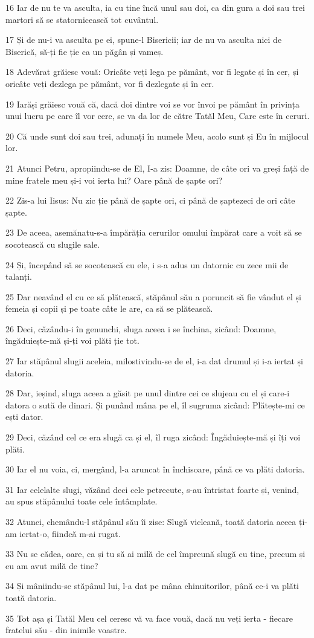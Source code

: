 \par 16 Iar de nu te va asculta, ia cu tine încă unul sau doi, ca din gura a doi sau trei martori să se statornicească tot cuvântul.
\par 17 Și de nu-i va asculta pe ei, spune-l Bisericii; iar de nu va asculta nici de Biserică, să-ți fie ție ca un păgân și vameș.
\par 18 Adevărat grăiesc vouă: Oricâte veți lega pe pământ, vor fi legate și în cer, și oricâte veți dezlega pe pământ, vor fi dezlegate și în cer.
\par 19 Iarăși grăiesc vouă că, dacă doi dintre voi se vor învoi pe pământ în privința unui lucru pe care îl vor cere, se va da lor de către Tatăl Meu, Care este în ceruri.
\par 20 Că unde sunt doi sau trei, adunați în numele Meu, acolo sunt și Eu în mijlocul lor.
\par 21 Atunci Petru, apropiindu-se de El, I-a zis: Doamne, de câte ori va greși față de mine fratele meu și-i voi ierta lui? Oare până de șapte ori?
\par 22 Zis-a lui Iisus: Nu zic ție până de șapte ori, ci până de șaptezeci de ori câte șapte.
\par 23 De aceea, asemănatu-s-a împărăția cerurilor omului împărat care a voit să se socotească cu slugile sale.
\par 24 Și, începând să se socotească cu ele, i s-a adus un datornic cu zece mii de talanți.
\par 25 Dar neavând el cu ce să plătească, stăpânul său a poruncit să fie vândut el și femeia și copii și pe toate câte le are, ca să se plătească.
\par 26 Deci, căzându-i în genunchi, sluga aceea i se închina, zicând: Doamne, îngăduiește-mă și-ți voi plăti ție tot.
\par 27 Iar stăpânul slugii aceleia, milostivindu-se de el, i-a dat drumul și i-a iertat și datoria.
\par 28 Dar, ieșind, sluga aceea a găsit pe unul dintre cei ce slujeau cu el și care-i datora o sută de dinari. Și punând mâna pe el, îl sugruma zicând: Plătește-mi ce ești dator.
\par 29 Deci, căzând cel ce era slugă ca și el, îl ruga zicând: Îngăduiește-mă și îți voi plăti.
\par 30 Iar el nu voia, ci, mergând, l-a aruncat în închisoare, până ce va plăti datoria.
\par 31 Iar celelalte slugi, văzând deci cele petrecute, s-au întristat foarte și, venind, au spus stăpânului toate cele întâmplate.
\par 32 Atunci, chemându-l stăpânul său îi zise: Slugă vicleană, toată datoria aceea ți-am iertat-o, fiindcă m-ai rugat.
\par 33 Nu se cădea, oare, ca și tu să ai milă de cel împreună slugă cu tine, precum și eu am avut milă de tine?
\par 34 Și mâniindu-se stăpânul lui, l-a dat pe mâna chinuitorilor, până ce-i va plăti toată datoria.
\par 35 Tot așa și Tatăl Meu cel ceresc vă va face vouă, dacă nu veți ierta - fiecare fratelui său - din inimile voastre.


